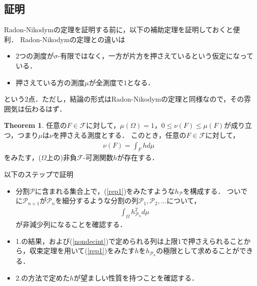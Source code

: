 \documentclass[a4paper,10pt]{jsarticle}
\theoremstyle{definition}
\newtheorem{theorem}{Theorem}
\newcommand{\eq}[1]{\begin{align}#1\end{align}}
\newcommand{\items}[1]{\begin{itemize}#1\end{itemize}}
\begin{document}
\subsection*{証明}
Radon-Nikodymの定理を証明する前に，以下の補助定理を証明しておくと便利．
Radon-Nikodymの定理との違いは
\items{
	\item $2$つの測度が$\sigma$-有限ではなく，一方が片方を押さえているという仮定になっている．
	\item 押さえている方の測度$\mu$が全測度で$1$となる．}
という$2$点．ただし，結論の形式はRadon-Nikodymの定理と同様なので，その雰囲気は伝わるはず．
\begin{theorem}
任意の$F\in\mathcal{F}$に対して，$\mu(\Omega)=1$，$0\le\nu(F)\le\mu(F)$が成り立つ，つまり$\mu$は$\nu$を押さえる測度とする．
このとき，任意の$F\in\mathcal{F}$に対して，
\eq{\nu(F)=\int_Fhd\mu\label{rep1}}
をみたす，($\Omega$上の)非負$\mathcal{F}$-可測関数$h$が存在する．
\end{theorem}
以下のステップで証明
\items{
	\item 分割$\mathcal{P}$に含まれる集合上で，(\ref{rep1})をみたすような$h_{\mathcal{P}}$を構成する．
		ついでに$\mathcal{P}_{n+1}$が$\mathcal{P}_n$を細分するような分割の列$\mathcal{P}_1,\mathcal{P}_2,...$について，
		\eq{\int_\Omega h^2_{\mathcal{P}_n}d\mu\label{nondecint}}
		が非減少列になることを確認する．
	\item 1.の結果，および(\ref{nondecint})で定められる列は上限$1$で押さえられることから，収束定理を用いて(\ref{rep1})をみたす$h$を$h_{\mathcal{P}_n}$の極限として求めることができる．
	\item 2.の方法で定めた$h$が望ましい性質を持つことを確認する．}
	
\end{document}
